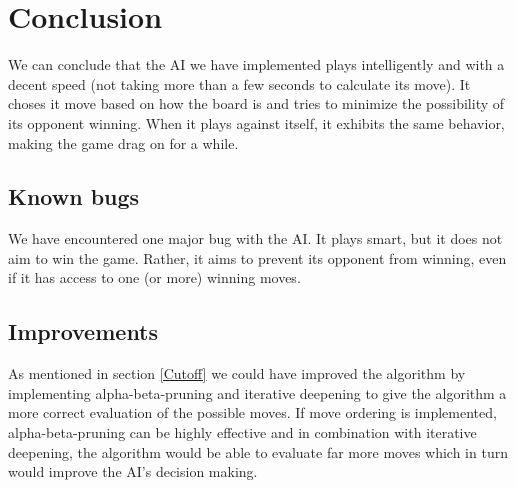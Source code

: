 \section{Conclusion}
\label{Conclusion}
We can conclude that the AI we have implemented plays intelligently and with a decent speed (not taking more than a few seconds to calculate its move). It choses it move based on how the board is and tries to minimize the possibility of its opponent winning. When it plays against itself, it exhibits the same behavior, making the game drag on for a while.

\subsection{Known bugs}
We have encountered one major bug with the AI. It plays smart, but it does not aim to win the game. Rather, it aims to prevent its opponent from winning, even  if it has access to one (or more) winning moves. 

\subsection{Improvements}
As mentioned in section \ref{Cutoff} we could have improved the algorithm by implementing alpha-beta-pruning and iterative deepening to give the algorithm a more correct evaluation of the possible moves. If move ordering is implemented, alpha-beta-pruning can be highly effective and in combination with iterative deepening, the algorithm would be able to evaluate far more moves which in turn would improve the AI's decision making.